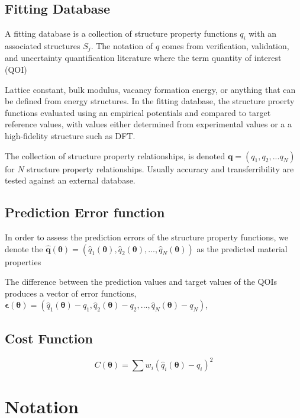 \subsection{Fitting Database}
A fitting database is a collection of structure property functions $q_i$ with an associated structures $S_j$.  The notation of $q$ comes from verification, validation, and uncertainty quantification literature where the term quantity of interest (QOI)

Lattice constant, bulk modulus, vacancy formation energy, or anything that can be defined from energy structures.  In the fitting database, the structure proerty functions evaluated using an empirical potentials and compared to target reference values, with values either determined from experimental values or a a high-fidelity structure such as DFT.

The collection of structure property relationships, is denoted $\bm{q}=(q_1,q_2,...q_N)$ for $N$ structure property relationships.  Usually accuracy and transferribility are tested against an external database.

\subsection{Prediction Error function}
In order to assess the prediction errors of the structure property functions, we denote the
      $\hat{\bm{q}}(\bm{\theta})=(
          \hat{q}_1(\bm{\theta}),
          \hat{q}_2(\bm{\theta}),
          ...,
          \hat{q}_N(\bm{\theta}))$
    as the predicted material properties

The difference between the prediction values and target values of the QOIs produces a vector of error functions, $\bm{\epsilon}(\bm{\theta})=(
        \hat{q}_1(\bm{\theta})-q_1,
        \hat{q}_2(\bm{\theta})-q_2,
        ...,
        \hat{q}_N(\bm{\theta})-q_N)$,

\subsection{Cost Function}

\begin{equation}
  C(\bm{\theta})=\sum w_i (\hat{q}_i(\bm{\theta})-q_i)^2
\end{equation}

\section{Notation}
